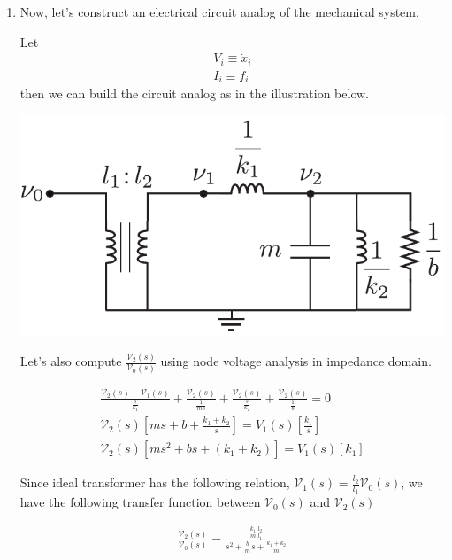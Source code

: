 \documentclass[twoside]{article}
\theoremstyle{definition}
\begin{document}
\begin{enumerate}
\item Now, let's construct an electrical circuit analog of the mechanical system.

Let 
%
\begin{align*}
	V_i \equiv \dot{x}_i
	\\
	I_i \equiv f_i
\end{align*}
%
then we can build the circuit analog as in the illustration below. 

  \begin{minipage}[h]{0.75\linewidth}
    \begin{center}
      \includegraphics[width=1\textwidth]{ex_elec}
    \end{center}
  \end{minipage}
  
  Let's also compute 
$\frac{\mathcal{V}_2(s)}{\mathcal{V_0}(s)}$ using node voltage analysis in impedance domain.

\begin{align*}
	\frac{\mathcal{V}_2(s) - \mathcal{V}_1(s) }{ \frac{s}{k_1} } + 
	\frac{\mathcal{V}_2(s)}{ \frac{1}{m s} } + 	\frac{\mathcal{V}_2(s)}{ \frac{s}{k_2} } +
	\frac{\mathcal{V}_2(s)}{ \frac{1}{b} } 
	= 0 
	\\
	\mathcal{V}_2(s) \left[ m s + b + \frac{k_1+k_2}{s} \right] = V_1(s) \left[  \frac{k_1}{s} \right]
	\\
	\mathcal{V}_2(s) \left[ m s^2 + b s + ( k_1 + k_2) \right] = V_1(s) \left[  k_1 \right]
\end{align*}

Since ideal transformer has the following relation, $\mathcal{V}_1(s) = \frac{l_2}{l_1} \mathcal{V}_0(s)$, 
we have the following transfer function between $\mathcal{V}_0(s)$ and $\mathcal{V}_2(s)$

\begin{align*}
\frac{\mathcal{V}_2(s)}{\mathcal{V}_0(s)} = \frac{\frac{k_1}{m} \frac{l_2}{l_1}}{s^2 + \frac{b}{m} s + \frac{k_1 + k_2}{m}}  
\end{align*}


\end{enumerate}
\end{document}
